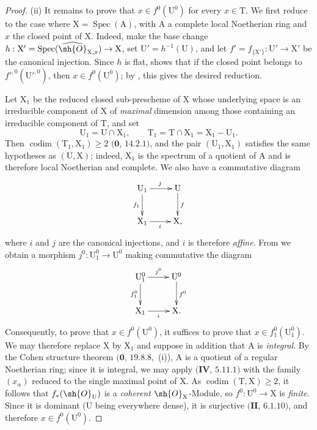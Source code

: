 \begin{proof}

(ii) It remains to prove that $x\in f^0(\mathrm{U}^0)$ for every $x\in\mathrm{T}$.
We first reduce to the case where $\mathrm{X}=\operatorname{Spec}(\mathrm{A})$, with $\mathrm{A}$ a complete local Noetherian ring and $x$ the closed point of $\mathrm{X}$.
Indeed, make the base change $h:\mathrm{X}'=\operatorname{Spec}(\widehat{\sh{O}}_{\mathrm{X},x})\to\mathrm{X}$, set $\mathrm{U}'=h^{-1}(\mathrm{U})$, and let $f'=f_{\{\mathrm{X}'\}}:\mathrm{U}'\to\mathrm{X}'$ be the canonical injection.
Since $h$ is flat,  shows that if the closed point belongs to $f'^{,0}(\mathrm{U}'^{,0})$, then $x\in f^0(\mathrm{U}^0)$; by , this gives the desired reduction.

Let $\mathrm{X}_1$ be the reduced closed sub-prescheme of $\mathrm{X}$ whose underlying space is an irreducible component of $\mathrm{X}$ of \emph{maximal} dimension among those containing an irreducible component of $\mathrm{T}$, and set
\[
  \mathrm{U}_1=\mathrm{U}\cap\mathrm{X}_1,
  \qquad
  \mathrm{T}_1=\mathrm{T}\cap\mathrm{X}_1=\mathrm{X}_1-\mathrm{U}_1.
\]
Then $\operatorname{codim}(\mathrm{T}_1,\mathrm{X}_1)\geq 2$ $(\mathbf{0}$, $14.2.1)$, and the pair $(\mathrm{U}_1,\mathrm{X}_1)$ satisfies the same hypotheses as $(\mathrm{U},\mathrm{X})$; indeed, $\mathrm{X}_1$ is the spectrum of a quotient of $\mathrm{A}$ and is therefore local Noetherian and complete.
We also have a commutative diagram
\[
  \xymatrix{
    \mathrm{U}_1 \ar[r]^j \ar[d]_{f_1} & \mathrm{U} \ar[d]^f \\
    \mathrm{X}_1 \ar[r]_i & \mathrm{X},
  }
\]
where $i$ and $j$ are the canonical injections, and $i$ is therefore \emph{affine}.  From  we obtain a morphism $j^0:\mathrm{U}_1^0\to\mathrm{U}^0$ making commutative the diagram
\[
  \xymatrix{
    \mathrm{U}_1^0 \ar[r]^{j^0} \ar[d]_{f_1^0} & \mathrm{U}^0 \ar[d]^{f^0} \\
    \mathrm{X}_1 \ar[r]_i & \mathrm{X}.
  }
\]
Consequently, to prove that $x\in f^0(\mathrm{U}^0)$, it suffices to prove that $x\in f_1^0(\mathrm{U}_1^0)$.
We may therefore replace $\mathrm{X}$ by $\mathrm{X}_1$ and suppose in addition that $\mathrm{A}$ is \emph{integral}.
By the Cohen structure theorem $(\mathbf{0}$, $19.8.8$,~(i)), $\mathrm{A}$ is a quotient of a regular Noetherian ring; since it is integral, we may apply $(\mathbf{IV}$, $5.11.1)$ with the family $(x_\alpha)$ reduced to the single maximal point of $\mathrm{X}$.
As $\operatorname{codim}(\mathrm{T},\mathrm{X})\geq 2$, it follows that $f_*(\sh{O}_{\mathrm{U}})$ is a \emph{coherent} $\sh{O}_{\mathrm{X}}$-Module, so $f^0:\mathrm{U}^0\to\mathrm{X}$ is \emph{finite}.  Since it is dominant ($\mathrm{U}$ being everywhere dense), it is surjective $(\mathbf{II}$, $6.1.10)$, and therefore $x\in f^0(\mathrm{U}^0)$.
\end{proof}

